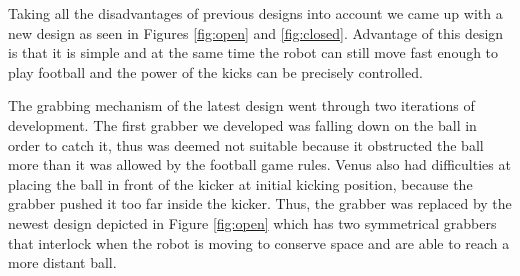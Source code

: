 \documentclass[12pt]{article}
\begin{document}
Taking all the disadvantages of previous designs into account we came up with a new design as seen in Figures \ref{fig:open} and \ref{fig:closed}. Advantage of this design is that it is simple and at the same time the robot can still move fast enough to play football and the power of the kicks can be precisely controlled. 

The grabbing mechanism of the latest design went through two iterations of development.
The first grabber we developed was falling down on the ball in order to catch it, thus was deemed not suitable because it obstructed the ball more than it was allowed by the football game rules. Venus also had difficulties at placing the ball in front of the kicker at initial kicking position, because the grabber pushed it
too far inside the kicker. Thus, the grabber was replaced by the newest design depicted in Figure \ref{fig:open} which has two symmetrical grabbers that interlock when the robot is moving to conserve space and are able to reach a more distant ball.
\end{document}
